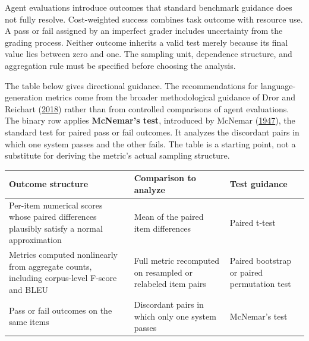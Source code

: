 Agent evaluations introduce outcomes that standard benchmark guidance does not fully resolve. Cost-weighted success combines task outcome with resource use. A pass or fail assigned by an imperfect grader includes uncertainty from the grading process. Neither outcome inherits a valid test merely because its final value lies between zero and one. The sampling unit, dependence structure, and aggregation rule must be specified before choosing the analysis.

The table below gives directional guidance. The recommendations for language-generation metrics come from the broader methodological guidance of Dror and Reichart (\href{https://arxiv.org/abs/1809.01448}{2018}) rather than from controlled comparisons of agent evaluations. The binary row applies \textbf{McNemar's test}, introduced by McNemar (\href{https://doi.org/10.1007/BF02295996}{1947}), the standard test for paired pass or fail outcomes. It analyzes the discordant pairs in which one system passes and the other fails. The table is a starting point, not a substitute for deriving the metric's actual sampling structure.

\begin{longtable}[]{@{}
  >{\raggedright\arraybackslash}p{}
  >{\raggedright\arraybackslash}p{}
  >{\raggedright\arraybackslash}p{}@{}}
\toprule\noalign{}
\begin{minipage}[b]{\linewidth}\raggedright
Outcome structure
\end{minipage} & \begin{minipage}[b]{\linewidth}\raggedright
Comparison to analyze
\end{minipage} & \begin{minipage}[b]{\linewidth}\raggedright
Test guidance
\end{minipage} \\
\midrule\noalign{}
\endhead
\bottomrule\noalign{}
\endlastfoot
Per-item numerical scores whose paired differences plausibly satisfy a normal approximation & Mean of the paired item differences & Paired t-test \\
Metrics computed nonlinearly from aggregate counts, including corpus-level F-score and BLEU & Full metric recomputed on resampled or relabeled item pairs & Paired bootstrap or paired permutation test \\
Pass or fail outcomes on the same items & Discordant pairs in which only one system passes & McNemar's test \\
\end{longtable}

